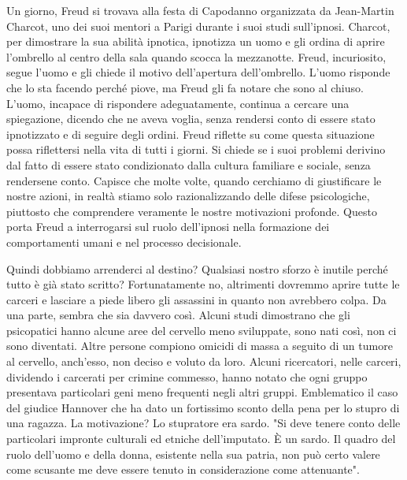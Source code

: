 \documentclass[12pt]{book} %
\begin{document}
Un giorno, Freud si trovava alla festa di Capodanno organizzata da Jean-Martin Charcot, uno dei suoi mentori a Parigi
durante i suoi studi sull'ipnosi. Charcot, per dimostrare la sua abilità ipnotica, ipnotizza un uomo e gli ordina di
aprire l'ombrello al centro della sala quando scocca la mezzanotte. Freud, incuriosito, segue l'uomo e gli chiede il
motivo dell'apertura dell'ombrello. L'uomo risponde che lo sta facendo perché piove, ma Freud gli fa notare che sono al
chiuso. L'uomo, incapace di rispondere adeguatamente, continua a cercare una spiegazione, dicendo che ne aveva voglia,
senza rendersi conto di essere stato ipnotizzato e di seguire degli ordini. Freud riflette su come questa situazione
possa riflettersi nella vita di tutti i giorni. Si chiede se i suoi problemi derivino dal fatto di essere stato
condizionato dalla cultura familiare e sociale, senza rendersene conto. Capisce che molte volte, quando cerchiamo di
giustificare le nostre azioni, in realtà stiamo solo razionalizzando delle difese psicologiche, piuttosto che
comprendere veramente le nostre motivazioni profonde. Questo porta Freud a interrogarsi sul ruolo dell'ipnosi nella
formazione dei comportamenti umani e nel processo decisionale.

Quindi dobbiamo arrenderci al destino? Qualsiasi nostro sforzo è inutile perché tutto è già stato scritto?
Fortunatamente no, altrimenti dovremmo aprire tutte le carceri e lasciare a piede libero gli assassini in quanto non
avrebbero colpa. Da una parte, sembra che sia davvero così. Alcuni studi dimostrano che gli psicopatici hanno alcune
aree del cervello meno sviluppate, sono nati così, non ci sono diventati. Altre persone compiono omicidi di massa a
seguito di un tumore al cervello, anch'esso, non deciso e voluto da loro. Alcuni ricercatori,
nelle carceri, dividendo i carcerati per crimine commesso, hanno notato che ogni gruppo presentava particolari geni
meno frequenti negli altri gruppi. Emblematico il caso del giudice Hannover che ha dato un fortissimo sconto della pena
per lo stupro di una ragazza. La motivazione? Lo stupratore era sardo. "Si deve tenere conto delle
particolari impronte culturali ed etniche dell'imputato. È un sardo. Il quadro del ruolo dell'uomo e della donna,
esistente nella sua patria, non può certo valere come scusante me deve essere tenuto in considerazione come
attenuante".


\bigskip
\end{document}
